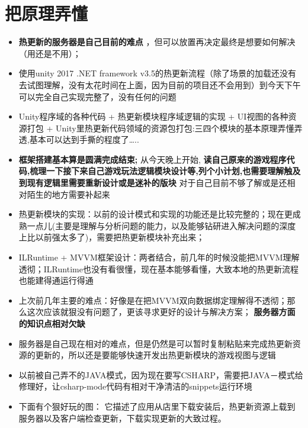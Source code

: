 \documentclass[9pt, b5paper]{article}
\begin{document}
\section{把原理弄懂}
\label{sec-4}
\begin{itemize}
\item \textbf{热更新的服务器是自己目前的难点} ，但可以放置再决定最终是想要如何解决（用还是不用）；
\item 使用unity 2017 .NET framework v3.5的热更新流程（除了场景的加载还没有去试图理解，没有太花时间在上面，因为目前的项目还不会用到）到今天下午可以完全自己实现完整了，没有任何的问题
\item Unity程序域的各种代码 + 热更新模块程序域逻辑的实现 + UI视图的各种资源打包 + Unity里热更新代码领域的资源包打包:三四个模块的基本原理弄懂弄透,基本可以达到手撕的程度了\ldots{}..
\item \textbf{框架搭建基本算是圆满完成结束;} 从今天晚上开始, \textbf{读自己原来的游戏程序代码,梳理一下接下来自己游戏玩法逻辑模块设计等,列个小计划,也需要理解触及到现有逻辑里需要重新设计或是迷补的版块} 对于自己目前不够了解或是还相对陌生的地方需要补起来
\item 热更新模块的实现：以前的设计模式和实现的功能还是比较完整的；现在更成熟一点儿(主要是理解与分析问题的能力，以及能够钻研进入解决问题的深度上比以前强太多了)，需要把热更新模块补充出来；
\item ILRuntime + MVVM框架设计：两者结合，前几年的时候没能把MVVM理解透彻；ILRuntime也没有看很懂，现在基本能够看懂，大致本地的热更新流程也能建得通运行得通
\item 上次前几年主要的难点：好像是在把MVVM双向数据绑定理解得不透彻；那么这次应该就狠没有问题了，更该寻求更好的设计与解决方案； \textbf{服务器方面的知识点相对欠缺}
\item 服务器是自己现在相对的难点，但是仍然是可以暂时复制粘贴来完成热更新资源的更新的，所以还是要能够快速开发出热更新模块的游戏视图与逻辑
\item 以前被自己弄不的JAVA模式，因为现在要写CSHARP，需要把JAVA－模式给修理好，让csharp-mode代码有相对干净清洁的snippets运行环境
\item 下面有个狠好玩的图： 它描述了应用从店里下载安装后，热更新资源上载到服务器以及客户端检查更新，下载实现更新的大致过程。
\end{itemize}
\end{document}
